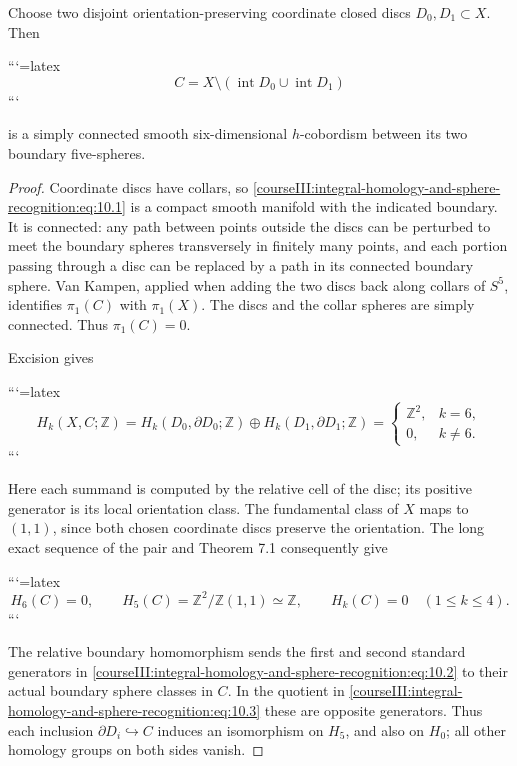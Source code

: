 \begin{proposition}
Choose two disjoint orientation-preserving coordinate closed discs \(D_0,D_1\subset X\). Then


```{=latex}
\begin{equation}
C=X\setminus(\operatorname{int}D_0\cup\operatorname{int}D_1)
\label{courseIII:integral-homology-and-sphere-recognition:eq:10.1}
\end{equation}
```


is a simply connected smooth six-dimensional \(h\)-cobordism between its two boundary five-spheres.
\end{proposition}
\begin{proof}
Coordinate discs have collars, so \eqref{courseIII:integral-homology-and-sphere-recognition:eq:10.1} is a compact smooth manifold with the indicated boundary. It is connected: any path between points outside the discs can be perturbed to meet the boundary spheres transversely in finitely many points, and each portion passing through a disc can be replaced by a path in its connected boundary sphere. Van Kampen, applied when adding the two discs back along collars of \(S^5\), identifies \(\pi_1(C)\) with \(\pi_1(X)\). The discs and the collar spheres are simply connected. Thus \(\pi_1(C)=0\).

Excision gives


```{=latex}
\begin{equation}
H_k(X,C;\mathbb Z)=
H_k(D_0,\partial D_0;\mathbb Z)\oplus
H_k(D_1,\partial D_1;\mathbb Z)
=
\begin{cases}\mathbb Z^2,&k=6,\\0,&k\ne6.\end{cases}
\label{courseIII:integral-homology-and-sphere-recognition:eq:10.2}
\end{equation}
```


Here each summand is computed by the relative cell of the disc; its positive generator is its local orientation class. The fundamental class of \(X\) maps to \((1,1)\), since both chosen coordinate discs preserve the orientation. The long exact sequence of the pair and Theorem 7.1 consequently give


```{=latex}
\begin{equation}
H_6(C)=0,\qquad
H_5(C)=\mathbb Z^2/\mathbb Z(1,1)\simeq\mathbb Z,
\qquad H_k(C)=0\quad(1\leq k\leq4).
\label{courseIII:integral-homology-and-sphere-recognition:eq:10.3}
\end{equation}
```


The relative boundary homomorphism sends the first and second standard generators in \eqref{courseIII:integral-homology-and-sphere-recognition:eq:10.2} to their actual boundary sphere classes in \(C\). In the quotient in \eqref{courseIII:integral-homology-and-sphere-recognition:eq:10.3} these are opposite generators. Thus each inclusion \(\partial D_i\hookrightarrow C\) induces an isomorphism on \(H_5\), and also on \(H_0\); all other homology groups on both sides vanish.


\end{proof}
